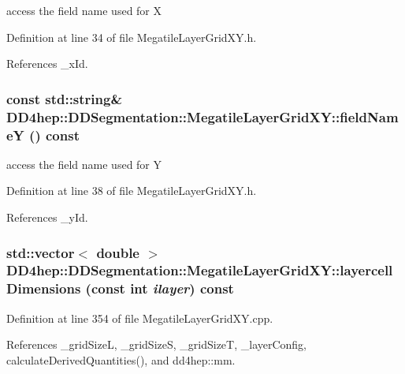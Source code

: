 access the field name used for X 

Definition at line 34 of file MegatileLayerGridXY.h.

References \_\-xId.\hypertarget{class_d_d4hep_1_1_d_d_segmentation_1_1_megatile_layer_grid_x_y_a5cd2d5c0487db9e75d56461d40178604}{
\subsubsection[{fieldNameY}]{\setlength{\rightskip}{0pt plus 5cm}const std::string\& DD4hep::DDSegmentation::MegatileLayerGridXY::fieldNameY () const}}
\label{class_d_d4hep_1_1_d_d_segmentation_1_1_megatile_layer_grid_x_y_a5cd2d5c0487db9e75d56461d40178604}


access the field name used for Y 

Definition at line 38 of file MegatileLayerGridXY.h.

References \_\-yId.\hypertarget{class_d_d4hep_1_1_d_d_segmentation_1_1_megatile_layer_grid_x_y_a78ab4055a7a8959b8b36fb243b3f83a3}{
\subsubsection[{layercellDimensions}]{\setlength{\rightskip}{0pt plus 5cm}std::vector$<$ double $>$ DD4hep::DDSegmentation::MegatileLayerGridXY::layercellDimensions (const int {\em ilayer}) const}}
\label{class_d_d4hep_1_1_d_d_segmentation_1_1_megatile_layer_grid_x_y_a78ab4055a7a8959b8b36fb243b3f83a3}


Definition at line 354 of file MegatileLayerGridXY.cpp.

References \_\-gridSizeL, \_\-gridSizeS, \_\-gridSizeT, \_\-layerConfig, calculateDerivedQuantities(), and dd4hep::mm.

